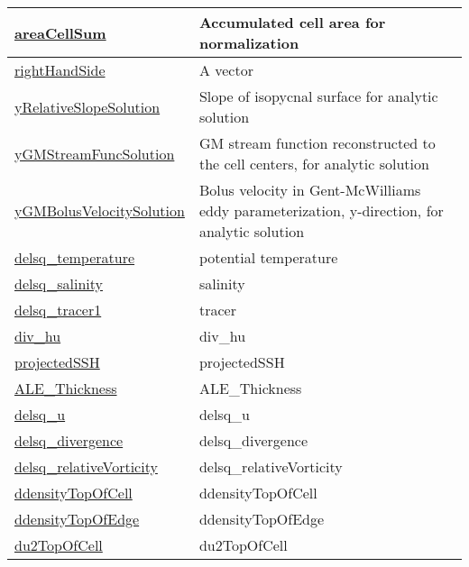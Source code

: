 {\begin{center}
\begin{longtable}{| p{2.0in} | p{4.0in} |}
    \hline
    \hyperref[subsec:var_sec_scratch_areaCellSum]{areaCellSum} & Accumulated cell area for normalization \\
    \hline
    \hyperref[subsec:var_sec_scratch_rightHandSide]{rightHandSide} & A vector \\
    \hline
    \hyperref[subsec:var_sec_scratch_yRelativeSlopeSolution]{yRelativeSlopeSolution} & Slope of isopycnal surface for analytic solution \\
    \hline
    \hyperref[subsec:var_sec_scratch_yGMStreamFuncSolution]{yGMStreamFuncSolution} & GM stream function reconstructed to the cell centers, for analytic solution \\
    \hline
    \hyperref[subsec:var_sec_scratch_yGMBolusVelocitySolution]{yGMBolusVelocitySolution} & Bolus velocity in Gent-McWilliams eddy parameterization, y-direction, for analytic solution \\
    \hline
    \hyperref[subsec:var_sec_scratch_delsq_temperature]{delsq\_temperature} & potential temperature \\
    \hline
    \hyperref[subsec:var_sec_scratch_delsq_salinity]{delsq\_salinity} & salinity \\
    \hline
    \hyperref[subsec:var_sec_scratch_delsq_tracer1]{delsq\_tracer1} & tracer \\
    \hline
    \hyperref[subsec:var_sec_scratch_div_hu]{div\_hu} & div\_hu \\
    \hline
    \hyperref[subsec:var_sec_scratch_projectedSSH]{projectedSSH} & projectedSSH \\
    \hline
    \hyperref[subsec:var_sec_scratch_ALE_Thickness]{ALE\_Thickness} & ALE\_Thickness \\
    \hline
    \hyperref[subsec:var_sec_scratch_delsq_u]{delsq\_u} & delsq\_u \\
    \hline
    \hyperref[subsec:var_sec_scratch_delsq_divergence]{delsq\_divergence} & delsq\_divergence \\
    \hline
    \hyperref[subsec:var_sec_scratch_delsq_relativeVorticity]{delsq\_relativeVorticity} & delsq\_relativeVorticity \\
    \hline
    \hyperref[subsec:var_sec_scratch_ddensityTopOfCell]{ddensityTopOfCell} & ddensityTopOfCell \\
    \hline
    \hyperref[subsec:var_sec_scratch_ddensityTopOfEdge]{ddensityTopOfEdge} & ddensityTopOfEdge \\
    \hline
    \hyperref[subsec:var_sec_scratch_du2TopOfCell]{du2TopOfCell} & du2TopOfCell \\

\end{longtable}
\end{center}}
